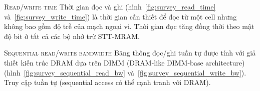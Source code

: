 
\textsc{Read/write time} \hspace{0.5cm} Thời gian đọc và ghi
(hình~\ref{fig:survey_read_time} và~\ref{fig:survey_write_time}) là thời gian
cần thiết để đọc từ một cell nhưng không bao gồm độ trễ của mạch ngoại vi. Thời
gian đọc tăng đồng thời theo mật độ bit ở tất cả các bộ nhớ trừ STT-MRAM.


\textsc{Sequential read/write bandwidth} \hspace{0.5cm} Băng thông đọc/ghi tuần
tự được tính với giả thiết kiến trúc DRAM dựa trên DIMM (DRAM-like DIMM-base
architecture) (hình~\ref{fig:survey_sequential_read_bw}
và~\ref{fig:survey_sequential_write_bw}). Truy cập tuần tự (sequential access
có thể cạnh tranh với DRAM).


